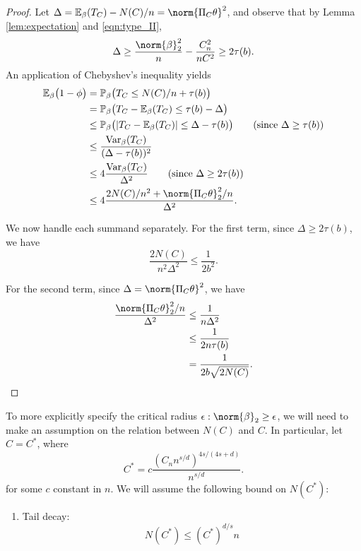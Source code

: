 \documentclass{article}
\newcommand{\abs}[1]{\left \lvert #1 \right \rvert}
\newcommand{\Var}{\mathrm{Var}}
\newcommand{\1}{\mathbf{1}}
\newcommand{\Pbb}{\mathbb{P}}
\newcommand{\Ebb}{\mathbb{E}}
\theoremstyle{alden}
\theoremstyle{aldenthm}
\theoremstyle{definition}
\theoremstyle{remark}
\begin{document}
\begin{proof}
	Let $\Delta = \Ebb_{\beta}(T_C) - N(C)/n = \norm{\Pi_C \theta}^2$, and observe that by Lemma \ref{lem:expectation} and \eqref{eqn:type_II},
	\begin{equation*}
	\Delta \geq \frac{\norm{\beta}_2^2}{n} - \frac{C_n^2}{nC^2} \geq 2 \tau(b).
	\end{equation*}
	An application of Chebyshev's inequality yields
	\begin{align*}
	\Ebb_{\beta}\bigl(1 - \phi\bigr) & = \Pbb_{\beta}\bigl(T_C \leq N(C)/n + \tau(b)\bigr) \\
	& = \Pbb_{\beta}\bigl(T_C - \Ebb_{\beta}(T_C) \leq \tau(b) - \Delta \bigr) \\
	& \leq \Pbb_{\beta}\bigl(\abs{T_C - \Ebb_{\beta}(T_C)} \leq \Delta - \tau(b) \bigr) \tag{since $\Delta \geq \tau(b)$}	\\
	& \leq \frac{\Var_{\beta}(T_C)}{(\Delta - \tau(b))^2} \\
	& \leq 4\frac{\Var_{\beta}(T_C)}{\Delta^2} \tag{since $\Delta \geq 2\tau(b)$} \\
	& \leq 4\frac{2N(C)/n^2 + \norm{\Pi_C\theta}_2^2/n}{\Delta^2}.
	\end{align*}
	
	We now handle each summand separately. For the first term, since $\Delta \geq 2 \tau(b)$, we have
	\begin{equation*}
	\frac{2N(C)}{n^2\Delta^2} \leq \frac{1}{2b^2}.
	\end{equation*}
	
	For the second term, since $\Delta = \norm{\Pi_C\theta}^2$, we have
	\begin{align*}
	\frac{\norm{\Pi_C\theta}_2^2/n}{\Delta^2} & \leq \frac{1}{n\Delta^2} \\
	& \leq \frac{1}{2n\tau(b)} \\
	& = \frac{1}{2b\sqrt{2N(C)}}.
	\end{align*}
\end{proof}

To more explicitly specify the critical radius $\epsilon: \norm{\beta}_2 \geq \epsilon$, we will need to make an assumption on the relation between $N(C)$ and $C$. In particular, let $C = C^*$, where
\begin{equation*}
\label{eqn:C_star}
C^* = c\frac{(C_n n^{s/d})^{4s/(4s + d)}}{n^{s/d}}.
\end{equation*}
for some $c$ constant in $n$. We will assume the following bound on $N(C^*)$:
\begin{enumerate}[label=(A\arabic*)]
	\item Tail decay:
	\label{asmp:tail_decay}
	\begin{equation*}
	N(C^*) \leq (C^*)^{d/s}n
	\end{equation*}
\end{enumerate}
\end{document}
